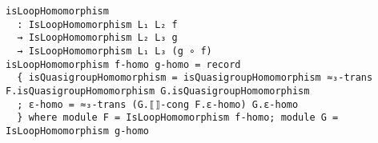 \begin{verbatim}
isLoopHomomorphism
  : IsLoopHomomorphism L₁ L₂ f
  → IsLoopHomomorphism L₂ L₃ g
  → IsLoopHomomorphism L₁ L₃ (g ∘ f)
isLoopHomomorphism f-homo g-homo = record
  { isQuasigroupHomomorphism = isQuasigroupHomomorphism ≈₃-trans F.isQuasigroupHomomorphism G.isQuasigroupHomomorphism
  ; ε-homo = ≈₃-trans (G.⟦⟧-cong F.ε-homo) G.ε-homo
  } where module F = IsLoopHomomorphism f-homo; module G = IsLoopHomomorphism g-homo
\end{verbatim}
